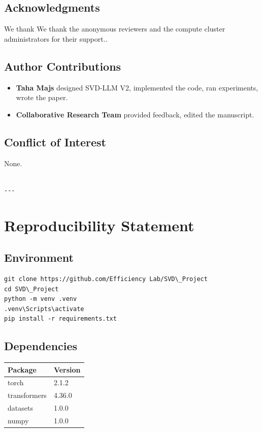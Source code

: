 \subsection{Acknowledgments}

We thank We thank the anonymous reviewers and the compute cluster administrators for their support..

\subsection{Author Contributions}

\begin{itemize}
\item \textbf{Taha Majs} designed SVD-LLM V2, implemented the code, ran experiments,
  wrote the paper.
\item \textbf{Collaborative Research Team} provided feedback, edited the manuscript.

\end{itemize}
\subsection{Conflict of Interest}

None.
\begin{lstlisting}

---
\end{lstlisting}


\section{Reproducibility Statement}

\subsection{Environment}

\begin{lstlisting}
git clone https://github.com/Efficiency Lab/SVD\_Project
cd SVD\_Project
python -m venv .venv
.venv\Scripts\activate
pip install -r requirements.txt
\end{lstlisting}

\subsection{Dependencies}

\begin{table}[H]
\centering
\small
\begin{tabular}{ll}
\toprule
\textbf{Package} & \textbf{Version} \\
\midrule
torch & 2.1.2 \\
transformers & 4.36.0 \\
datasets & 1.0.0 \\
numpy & 1.0.0 \\
\bottomrule
\end{tabular}
\end{table}

